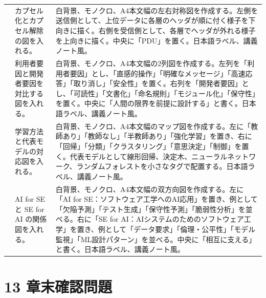 \documentclass[a4paper,11pt]{ltjsarticle}
\begin{document}
\begin{longtable}{>{\raggedright\arraybackslash}p{}>{\raggedright\arraybackslash}p{}>{\raggedright\arraybackslash}p{}}
15 & カプセル化とカプセル解除の図を入れる。 & 白背景、モノクロ、A4本文幅の左右対称図を作成する。左側を送信側として、上位データに各層のヘッダが順に付く様子を下向きに描く。右側を受信側として、各層でヘッダが外れる様子を上向きに描く。中央に「PDU」を置く。日本語ラベル、講義ノート風。 \\
16 & 利用者要因と開発者要因を対比する図を入れる。 & 白背景、モノクロ、A4本文幅の2列図を作成する。左列を「利用者要因」とし、「直感的操作」「明確なメッセージ」「高速応答」「取り消し」「安全性」を置く。右列を「開発者要因」とし、「可読性」「文書化」「命名規則」「モジュール化」「保守性」を置く。中央に「人間の限界を前提に設計する」と書く。日本語ラベル、講義ノート風。 \\
17 & 学習方法と代表モデルの対応図を入れる。 & 白背景、モノクロ、A4本文幅のマップ図を作成する。左に「教師あり」「教師なし」「半教師あり」「強化学習」を置き、右に「回帰」「分類」「クラスタリング」「意思決定」「制御」を置く。代表モデルとして線形回帰、決定木、ニューラルネットワーク、ランダムフォレストを小さなタグで配置する。日本語ラベル、講義ノート風。 \\
18 & AI for SE と SE for AI の関係図を入れる。 & 白背景、モノクロ、A4本文幅の双方向図を作成する。左に「AI for SE：ソフトウェア工学へのAI応用」を置き、例として「欠陥予測」「テスト生成」「保守性予測」「脆弱性分析」を並べる。右に「SE for AI：AIシステムのためのソフトウェア工学」を置き、例として「データ要求」「倫理・公平性」「モデル監視」「ML設計パターン」を並べる。中央に「相互に支える」と書く。日本語ラベル、講義ノート風。 \\
\bottomrule
\end{longtable}

\section{13 章末確認問題}
\end{document}
